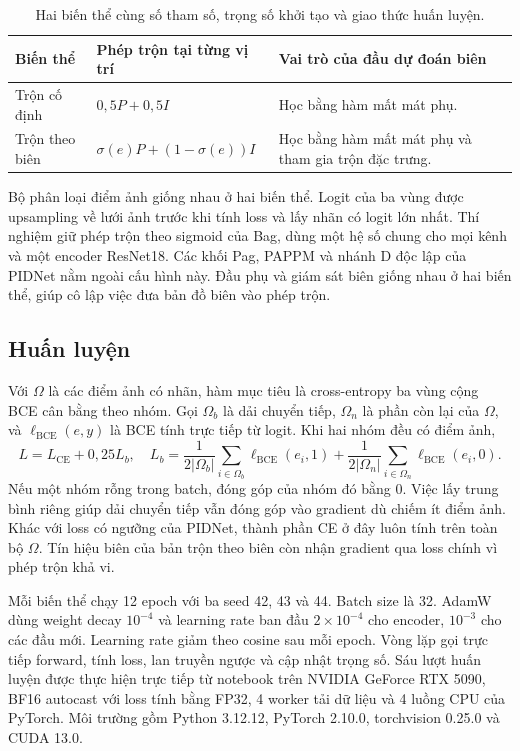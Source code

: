 \documentclass[12pt,a4paper]{report}
\begin{document}
\begin{table}[htbp]
\centering
\begin{tabularx}{\linewidth}{@{}lXX@{}}
\toprule
Biến thể & Phép trộn tại từng vị trí & Vai trò của đầu dự đoán biên\\
\midrule
Trộn cố định & $0{,}5P+0{,}5I$ & Học bằng hàm mất mát phụ.\\
Trộn theo biên & $\sigma(e)P+(1-\sigma(e))I$ & Học bằng hàm mất mát phụ và tham gia trộn đặc trưng.\\
\bottomrule
\end{tabularx}
\caption{Hai biến thể cùng số tham số, trọng số khởi tạo và giao thức huấn luyện.}
\label{tab:variants}
\end{table}

Bộ phân loại điểm ảnh giống nhau ở hai biến thể. Logit của ba vùng được upsampling về lưới ảnh trước khi tính loss và lấy nhãn có logit lớn nhất. Thí nghiệm giữ phép trộn theo sigmoid của Bag, dùng một hệ số chung cho mọi kênh và một encoder ResNet18. Các khối Pag, PAPPM và nhánh D độc lập của PIDNet nằm ngoài cấu hình này. Đầu phụ và giám sát biên giống nhau ở hai biến thể, giúp cô lập việc đưa bản đồ biên vào phép trộn.

\subsection{Huấn luyện}

Với $\Omega$ là các điểm ảnh có nhãn, hàm mục tiêu là cross-entropy ba vùng cộng BCE cân bằng theo nhóm. Gọi $\Omega_b$ là dải chuyển tiếp, $\Omega_n$ là phần còn lại của $\Omega$, và $\ell_{\mathrm{BCE}}(e,y)$ là BCE tính trực tiếp từ logit. Khi hai nhóm đều có điểm ảnh,
\[
 L=L_{\mathrm{CE}}+0{,}25 L_b,\quad
 L_b=\frac{1}{2|\Omega_b|}\sum_{i\in\Omega_b}\ell_{\mathrm{BCE}}(e_i,1)
    +\frac{1}{2|\Omega_n|}\sum_{i\in\Omega_n}\ell_{\mathrm{BCE}}(e_i,0).
\]
Nếu một nhóm rỗng trong batch, đóng góp của nhóm đó bằng 0. Việc lấy trung bình riêng giúp dải chuyển tiếp vẫn đóng góp vào gradient dù chiếm ít điểm ảnh. Khác với loss có ngưỡng của PIDNet, thành phần CE ở đây luôn tính trên toàn bộ $\Omega$. Tín hiệu biên của bản trộn theo biên còn nhận gradient qua loss chính vì phép trộn khả vi.

Mỗi biến thể chạy 12 epoch với ba seed 42, 43 và 44. Batch size là 32. AdamW dùng weight decay $10^{-4}$ và learning rate ban đầu $2\times10^{-4}$ cho encoder, $10^{-3}$ cho các đầu mới. Learning rate giảm theo cosine sau mỗi epoch. Vòng lặp gọi trực tiếp forward, tính loss, lan truyền ngược và cập nhật trọng số. Sáu lượt huấn luyện được thực hiện trực tiếp từ notebook trên NVIDIA GeForce RTX 5090, BF16 autocast với loss tính bằng FP32, 4 worker tải dữ liệu và 4 luồng CPU của PyTorch. Môi trường gồm Python 3.12.12, PyTorch 2.10.0, torchvision 0.25.0 và CUDA 13.0.
\end{document}
